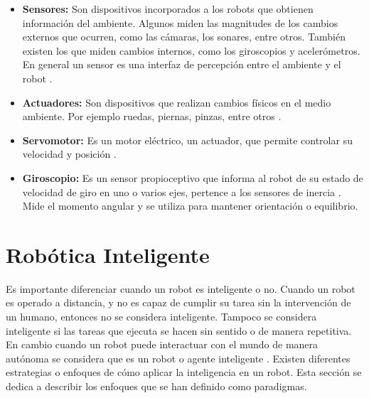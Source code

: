 \begin{itemize}
\item{\textbf{Sensores:} Son dispositivos incorporados a los robots que obtienen información del ambiente. Algunos miden las magnitudes de los cambios externos que ocurren, como las c\'amaras, los sonares, entre otros. Tambi\'en existen los que miden cambios internos, como los giroscopios y aceler\'ometros. En general un sensor es una interfaz de percepci\'on entre el ambiente y el robot \cite{peterNorvig}.}


\item{\textbf{Actuadores:} Son dispositivos que realizan cambios f\'isicos en el medio ambiente. Por ejemplo ruedas, piernas, pinzas, entre otros \cite{peterNorvig}.}

\item{\textbf{Servomotor:}  Es un motor eléctrico, un actuador, que permite controlar su velocidad y posici\'on  \cite{AiRobotics}. }


\item{\textbf{Giroscopio:} Es un sensor propioceptivo que informa al robot de su estado de velocidad de giro en uno o varios ejes, pertence a los sensores de inercia \cite{peterNorvig}. Mide el momento angular y se utiliza para mantener orientaci\'on o equilibrio.}

\end{itemize}

\section{Robótica Inteligente} \label{sect:AgentesInteligentes}

Es importante diferenciar cuando un robot es inteligente o no. Cuando un robot es operado a distancia, y no es capaz de cumplir su tarea sin la intervención de un humano, entonces no se considera  inteligente. Tampoco se considera inteligente si las tareas que ejecuta se hacen sin sentido o de manera repetitiva. En cambio cuando un robot puede interactuar con el mundo de manera autónoma se considera que es un robot o agente inteligente \cite{AiRobotics}. Existen diferentes estrategias o enfoques de cómo aplicar la inteligencia en un robot. Esta sección se dedica a describir los enfoques que se han definido como paradigmas. 

